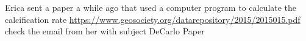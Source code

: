Erica sent a paper a while ago that used a computer program to calculate the calcification rate  \url{https://www.geosociety.org/datarepository/2015/2015015.pdf} check the email from her with subject DeCarlo Paper




